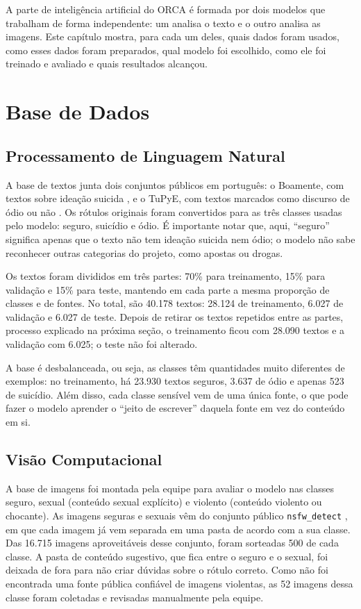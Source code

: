 \documentclass[
    12pt,           %
    oneside,        %
    a4paper,        %
    chapter=TITLE,  %
    english,        %
    brazil          %
]{abntex2}
\begin{document}
A parte de inteligência artificial do ORCA é formada por dois modelos que
trabalham de forma independente: um analisa o texto e o outro analisa as
imagens. Este capítulo mostra, para cada um deles, quais dados foram usados,
como esses dados foram preparados, qual modelo foi escolhido, como ele foi
treinado e avaliado e quais resultados alcançou.
\section{Base de Dados}

\subsection{Processamento de Linguagem Natural}

A base de textos junta dois conjuntos públicos em português: o Boamente, com
textos sobre ideação suicida \cite{boamente}, e o TuPyE, com textos marcados
como discurso de ódio ou não \cite{tupye}. Os rótulos originais foram
convertidos para as três classes usadas pelo modelo: seguro, suicídio e ódio.
É importante notar que, aqui, ``seguro'' significa apenas que o texto não tem
ideação suicida nem ódio; o modelo não sabe reconhecer outras categorias do
projeto, como apostas ou drogas.

Os textos foram divididos em três partes: 70\% para treinamento, 15\% para
validação e 15\% para teste, mantendo em cada parte a mesma proporção de
classes e de fontes. No total, são 40.178 textos: 28.124 de treinamento,
6.027 de validação e 6.027 de teste. Depois de retirar os textos repetidos
entre as partes, processo explicado na próxima seção, o treinamento ficou com
28.090 textos e a validação com 6.025; o teste não foi alterado.

A base é desbalanceada, ou seja, as classes têm quantidades muito diferentes
de exemplos: no treinamento, há 23.930 textos seguros, 3.637 de ódio e apenas
523 de suicídio. Além disso, cada classe sensível vem de uma única fonte, o
que pode fazer o modelo aprender o ``jeito de escrever'' daquela fonte em vez
do conteúdo em si.
\subsection{Visão Computacional}

A base de imagens foi montada pela equipe para avaliar o modelo nas classes
seguro, sexual (conteúdo sexual explícito) e violento (conteúdo violento ou
chocante). As imagens seguras e sexuais vêm do conjunto público
\texttt{nsfw\_detect} \cite{deepghs}, em que cada imagem já vem separada em
uma pasta de acordo com a sua classe. Das 16.715 imagens aproveitáveis desse
conjunto, foram sorteadas 500 de cada classe. A pasta de conteúdo sugestivo,
que fica entre o seguro e o sexual, foi deixada de fora para não criar
dúvidas sobre o rótulo correto. Como não foi encontrada uma fonte pública
confiável de imagens violentas, as 52 imagens dessa classe foram coletadas e
revisadas manualmente pela equipe.
\end{document}
